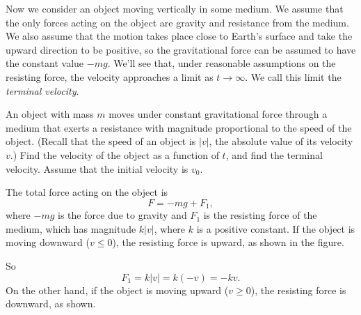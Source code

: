 \documentclass{ximera}
\begin{document}
Now we consider an object moving vertically in some medium. We assume
that the only forces acting on the object are gravity and resistance
from the medium. We also assume that the motion takes place close to
Earth's surface and take the upward direction to be positive, so
 the gravitational force can be assumed to have the constant value
 $-mg$. We'll see that, under reasonable assumptions on the
resisting force, the velocity approaches a limit as $t\to\infty$.
We call this limit the \textit{terminal velocity}.
 
\begin{example}\label{example:4.3.1}
An object with mass $m$ moves under constant gravitational force
through a medium that exerts a resistance with magnitude proportional
to the speed of the object. (Recall that the speed of an object is
$|v|$, the absolute value of its velocity $v$.) Find the velocity of
the object as a function of $t$, and find the terminal velocity.
Assume  that the initial velocity is $v_0$.
  
 
\begin{explanation}
The total force acting on the object is
\begin{equation} \label{eq:4.3.4}
F=-mg+F_1,
\end{equation}
where $-mg$ is  the force due to  gravity and $F_1$ is the
resisting force of the medium, which has magnitude $k|v|$, where $k$ is a
positive constant. If the
object is moving downward ($v\leq 0$),  the resisting force is
upward, as shown in the figure.

\begin{center}
\end{center}

 
So
$$
F_1=k|v|=k(-v)=-kv.
$$
On the other hand, if the object is moving upward ($v\geq 0$),
the resisting force is downward, as shown.

\begin{center}
\end{center}
\end{explanation}
\end{example}
\end{document}
